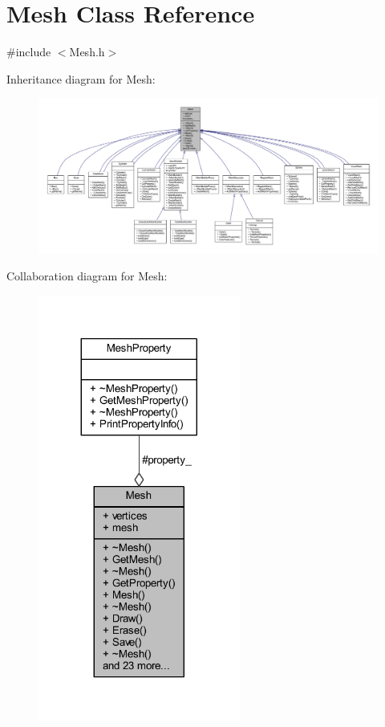 \hypertarget{class_mesh}{}\section{Mesh Class Reference}
\label{class_mesh}


{\ttfamily \#include $<$Mesh.\+h$>$}



Inheritance diagram for Mesh\+:
\nopagebreak
\begin{figure}[H]
\begin{center}
\leavevmode
\includegraphics[width=350pt]{class_mesh__inherit__graph}
\end{center}
\end{figure}


Collaboration diagram for Mesh\+:
\nopagebreak
\begin{figure}[H]
\begin{center}
\leavevmode
\includegraphics[width=188pt]{class_mesh__coll__graph}
\end{center}
\end{figure}
